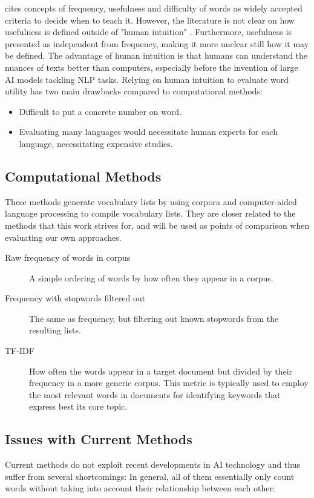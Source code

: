 \cite{heChoosingWordsTeach2019} cites concepts of frequency, usefulness and difficulty of words as widely accepted criteria to decide when to teach it.
However, the literature is not clear on how usefulness is defined outside of "human intuition" \cite{heChoosingWordsTeach2019}.
Furthermore, usefulness is presented as independent from frequency, making it more unclear still how it may be defined.
The advantage of human intuition is that humans can understand the nuances of texts better than computers, especially before the invention of large AI models tackling NLP tasks.
Relying on human intuition to evaluate word utility has two main drawbacks compared to computational methods:
\begin{itemize}
	\item Difficult to put a concrete number on word.
	\item Evaluating many languages would necessitate human experts for each language, necessitating expensive studies.
\end{itemize}

\subsection{Computational Methods}
These methods generate vocabulary lists by using corpora and computer-aided language processing to compile vocabulary lists.
They are closer related to the methods that this work strives for, and will be used as points of comparison when evaluating our own approaches.

\begin{description}
	\item [Raw frequency of words in corpus]
	      A simple ordering of words by how often they appear in a corpus.
	\item [Frequency with stopwords filtered out]
	      The same as frequency, but filtering out known stopwords from the resulting lists.
	\item [TF-IDF]
	      How often the words appear in a target document but divided by their frequency in a more generic corpus.
	      This metric is typically used to employ the most relevant words in documents for identifying keywords that express best its core topic.
\end{description}

\subsection{Issues with Current Methods}
Current methods do not exploit recent developments in AI technology and thus suffer from several shortcomings:
In general, all of them essentially only count words without taking into account their relationship between each other:

